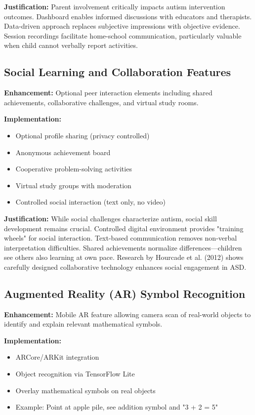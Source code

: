 \documentclass[11pt, a4paper]{article}
\begin{document}
\textbf{Justification:} Parent involvement critically impacts autism intervention outcomes. Dashboard enables informed discussions with educators and therapists. Data-driven approach replaces subjective impressions with objective evidence. Session recordings facilitate home-school communication, particularly valuable when child cannot verbally report activities.

\subsection{Social Learning and Collaboration Features}

\textbf{Enhancement:} Optional peer interaction elements including shared achievements, collaborative challenges, and virtual study rooms.

\textbf{Implementation:}
\begin{itemize}[leftmargin=*, noitemsep]
    \item Optional profile sharing (privacy controlled)
    \item Anonymous achievement board
    \item Cooperative problem-solving activities
    \item Virtual study groups with moderation
    \item Controlled social interaction (text only, no video)
\end{itemize}

\textbf{Justification:} While social challenges characterize autism, social skill development remains crucial. Controlled digital environment provides "training wheels" for social interaction. Text-based communication removes non-verbal interpretation difficulties. Shared achievements normalize differences—children see others also learning at own pace. Research by Hourcade et al. (2012) shows carefully designed collaborative technology enhances social engagement in ASD.

\subsection{Augmented Reality (AR) Symbol Recognition}

\textbf{Enhancement:} Mobile AR feature allowing camera scan of real-world objects to identify and explain relevant mathematical symbols.

\textbf{Implementation:}
\begin{itemize}[leftmargin=*, noitemsep]
    \item ARCore/ARKit integration
    \item Object recognition via TensorFlow Lite
    \item Overlay mathematical symbols on real objects
    \item Example: Point at apple pile, see addition symbol and "3 + 2 = 5"
\end{itemize}
\end{document}
